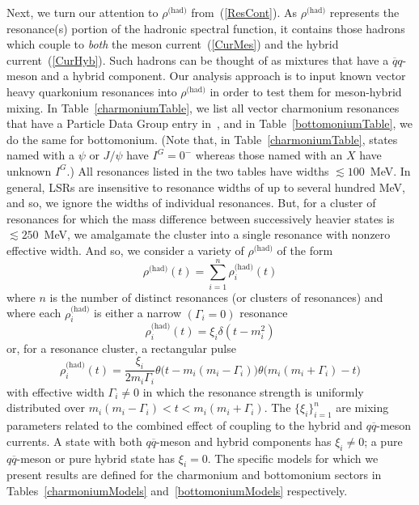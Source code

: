 \documentclass[11pt, letterpaper]{article}
\begin{document}
Next, we turn our attention to $\rho^{\text{(had)}}$ from~(\ref{ResCont}).
As $\rho^{\text{(had)}}$ represents the resonance(s) portion of the hadronic
spectral function, it contains those hadrons which couple to \emph{both} the 
meson current~(\ref{CurMes}) and the hybrid current~(\ref{CurHyb}).
Such hadrons can be thought of as mixtures that have a 
$\overline{q}q$-meson and a hybrid component.
Our analysis approach is to input known vector heavy quarkonium
resonances into $\rho^{\text{(had)}}$ in order to test them for 
meson-hybrid mixing.
In Table~\ref{charmoniumTable}, we list all vector charmonium
resonances that have a Particle Data Group entry in~\cite{Olive:2016xmw}, and 
in Table~\ref{bottomoniumTable}, we do the same for bottomonium.
(Note that, in Table~\ref{charmoniumTable}, states named with a $\psi$ or $J/\psi$
have $I^G=0^{-}$ whereas those named with an $X$ have unknown $I^G$.)
All resonances listed in the two tables have widths $\lesssim100$~MeV.
In general, LSRs are insensitive to resonance widths of up to several 
hundred MeV, and so, we ignore the widths of individual resonances.
But, for a cluster of resonances for which the mass difference between 
successively heavier states is $\lesssim250$~MeV, we amalgamate the cluster
into a single resonance with nonzero effective width.
And so, we consider a variety of $\rho^{\text{(had)}}$ of the form
%
\begin{equation}\label{rhoForms}
  \rho^{\text{(had)}}(t)=\sum_{i=1}^n \rho^{\text{(had)}}_i(t)
\end{equation}
%
where $n$ is the number of distinct resonances (or clusters of resonances) and 
where each $\rho_i^{\text{(had)}}$ is either a narrow $(\Gamma_i=0)$ resonance
%
\begin{equation}\label{narrow}
  \rho_i^{\text{(had)}}(t) = \xi_i \delta(t-m_i^2)
\end{equation}
%
or, for a resonance cluster, a rectangular pulse 
%
\begin{equation}\label{pulse}
  \rho_i^{\text{(had)}}(t) = \frac{\xi_i}{2m_i \Gamma_i}
  \theta\big(t-m_i(m_i-\Gamma_i)\big)\theta\big(m_i(m_i+\Gamma_i)-t\big)
\end{equation}
%
with effective width $\Gamma_i \neq 0$ 
in which the resonance strength is uniformly distributed over 
$m_i(m_i-\Gamma_i)<t<m_i(m_i+\Gamma_i)$.
The $\{\xi_i\}_{i=1}^n$ are mixing parameters related to
the combined effect of coupling to the hybrid and $q\overline{q}$-meson currents. 
A state with both $q\overline{q}$-meson and hybrid components has 
$\xi_i\neq0$; a pure $q\overline{q}$-meson or pure hybrid state has 
$\xi_i=0$.
The specific models for which we present results are defined for the charmonium 
and bottomonium sectors in Tables~\ref{charmoniumModels} and~\ref{bottomoniumModels} respectively.
\end{document}
